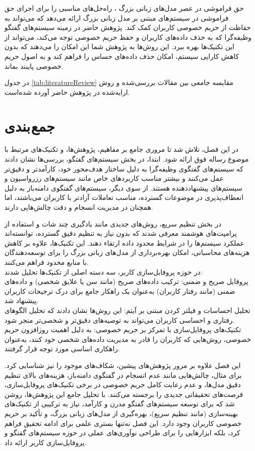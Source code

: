 حق فراموشی در عصر مدل‌های زبانی بزرگ 
\cite{zhang2024right}
، راه‌حل‌های مناسبی را برای اجرای حق فراموشی در سیستم‌های مبتنی بر مدل‌ زبانی بزرگ ارائه می‌دهد که می‌تواند به حفاظت از حریم خصوصی کاربران کمک کند. پژوهش حاضر در زمینه سیستم‌های گفتگو وظیفه‌گرا که به حذف داده‌های کاربران و حفظ حریم خصوصی توجه می‌کند، می‌تواند از این تکنیک‌ها بهره ببرد. این روش‌ها به پژوهش شما این امکان را می‌دهند که بدون کاهش کارایی سیستم، امکان حذف داده‌های حساس را فراهم کند و به اصول حریم خصوصی پایبند بماند.


در جدول%
\ref{tab:literatureReview}
مقایسه جامعی بین مقالات بررسی‌شده و روش ارایه‌شده در پژوهش حاضر آورده شده‌است.

 
   


\section{جمع بندی}
در این فصل، تلاش شد تا مروری جامع بر مفاهیم، پژوهش‌ها، و تکنیک‌های مرتبط با موضوع رساله فوق ارائه شود. ابتدا، در بخش سیستم‌های گفتگو، بررسی‌ها نشان دادند که سیستم‌های گفتگوی وظیفه‌گرا به دلیل ساختار هدف‌محور خود، کارآمدتر و دقیق‌تر عمل می‌کنند و بیشتر مناسب کاربردهای خاص مانند سیستم‌های رزرواسیون و سیستم‌های پیشنهاددهنده هستند. 
از سوی دیگر، سیستم‌های گفتگوی دامنه‌باز به دلیل انعطاف‌پذیری در موضوعات گسترده، مناسب تعاملات آزادتر با کاربران می‌باشند، اما همچنان در مدیریت انسجام و دقت چالش‌هایی دارند.
\newline

در بخش تنظیم سریع، روش‌های جدیدی مانند یادگیری چند شات و استفاده از پرامپت‌های هوشمند معرفی شدند که بدون نیاز به تنظیم دقیق گسترده، توانسته‌اند عملکرد سیستم‌ها را در شرایط محدود داده ارتقاء دهند. این تکنیک‌ها، علاوه بر کاهش هزینه‌های محاسباتی، امکان بهره‌برداری از مدل‌های زبانی بزرگ را برای توسعه‌دهندگان با منابع محدود فراهم می‌کنند.\\
در حوزه پروفایل‌سازی کاربر، سه دسته اصلی از تکنیک‌ها تحلیل شدند:\\
پروفایل صریح و ضمنی: ترکیب داده‌های صریح (مانند سن یا علایق شخصی) و داده‌های ضمنی (مانند رفتار کاربران) به‌عنوان یک راهکار جامع برای درک ترجیحات کاربران پیشنهاد شد.  \\
تحلیل احساسات و فیلتر کردن مبتنی بر آیتم: این روش‌ها نشان دادند که تحلیل الگوهای رفتاری و احساسی کاربران می‌تواند به توصیه‌های دقیق‌تر و شخصی‌تر منجر شود.  \\
تکنیک‌های پروفایل‌سازی با تمرکز بر حریم خصوصی: به دلیل اهمیت روزافزون حریم خصوصی، روش‌هایی که کاربران را قادر به مدیریت داده‌های شخصی خود کنند، به‌عنوان راهکاری اساسی مورد توجه قرار گرفتند.

این فصل علاوه بر مرور پژوهش‌های پیشین، شکاف‌های موجود را نیز شناسایی کرد. برای مثال، چالش‌هایی مانند عدم انسجام در گفتگوی دامنه‌باز، هزینه‌های بالای تنظیم دقیق مدل‌ها، و عدم رعایت کامل حریم خصوصی در برخی تکنیک‌های پروفایل‌سازی، فرصت‌های تحقیقاتی جدیدی را برجسته می‌کنند.
\newline
با تحلیل جامع این پژوهش‌ها، روشن شد که برای توسعه سیستم‌های گفتگو مدرن و کارآمد، نیاز به ترکیبی از تکنیک‌های بهینه‌سازی (مانند تنظیم سریع)، بهره‌گیری از مدل‌های زبانی بزرگ، و تأکید بر حریم خصوصی کاربران وجود دارد. این فصل نه‌تنها بستری علمی برای ادامه تحقیق فراهم کرد، بلکه ابزارهایی را برای طراحی نوآوری‌های عملی در حوزه سیستم‌های گفتگو و پروفایل‌سازی کاربر ارائه داد.